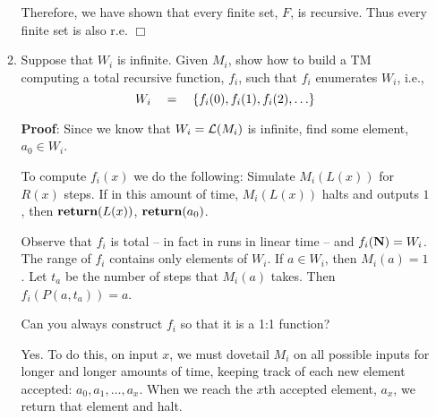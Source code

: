 \documentclass[12pt]{article}
\begin{document}
\begin{enumerate}
\begin{enumerate}
    Therefore, we have shown that every finite set, $F$, is recursive. 
    Thus every finite set is also r.e. 
$\Box$
    
    
   \item Suppose that $W_i$ is infinite.  Given $M_i$, show how to build a TM computing a total
     recursive function, $f_i$, such that $f_i$ enumerates $W_i$, i.e., 
\[ W_i \quad =\quad \{ f_i(0), f_i(1), f_i(2), \ldots  \}\]

		\textbf{Proof}: Since we know that $W_i = {\cal L}(M_i)$ is infinite, find some element,
                $a_0 \in W_i$.

To compute $f_i(x)$ we do the following:  Simulate $M_i(L(x))$ for $R(x)$ steps.  If in this amount
of time, $M_i(L(x))$ halts and outputs $1$, then $\mbox{{\bf return}}(L(x))$, \Else $\mbox{{\bf return}}(a_0)$.

Observe that $f_i$ is total -- in fact in runs in linear time -- and $f_i(\mbox{\bf N}) = W_i$.  The range of
$f_i$ contains only elements of $W_i$.  If $a\in W_i$, then $M_i(a) = 1$.  Let $t_a$ be the number
of steps that $M_i(a)$ takes.  Then $f_i(P(a,t_a))= a$.


\vspace*{.1in}



Can you always construct $f_i$ so that it is a 1:1 function?

Yes.  To do this, on input $x$, we must dovetail $M_i$ on all possible inputs for longer and longer
amounts of time, keeping track of each new element accepted: $a_0, a_1, \ldots, a_x$.  When we reach
the $x$th accepted element, $a_x$, we return that element and halt.
  \end{enumerate}

\end{enumerate}
\end{document}
